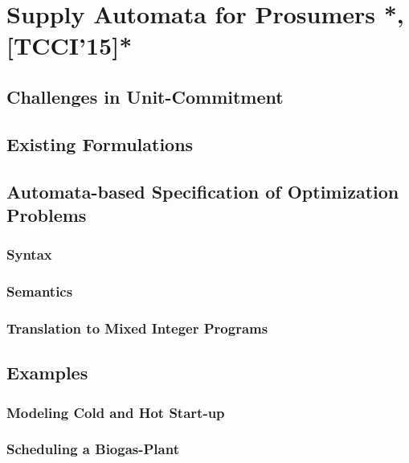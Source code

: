 \documentclass[10pt,a4paper]{book}
\begin{document}
\chapter{Supply Automata for Prosumers *, [TCCI'15]*}
\section{Challenges in Unit-Commitment}
\section{Existing Formulations}
\section{Automata-based Specification of Optimization Problems}
\subsection{Syntax}
\subsection{Semantics}
\subsection{Translation to Mixed Integer Programs}
\section{Examples}
\subsection{Modeling Cold and Hot Start-up}
\subsection{Scheduling a Biogas-Plant}
\end{document}
